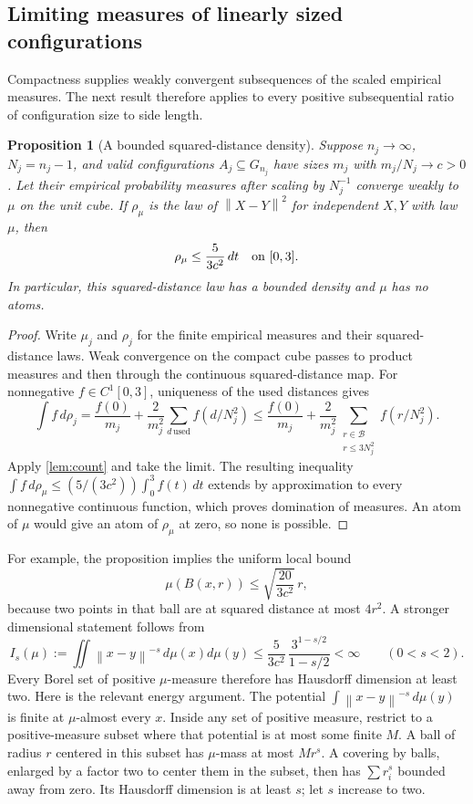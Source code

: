 \documentclass[11pt,letterpaper]{article}
\newtheorem{proposition}[theorem]{Proposition}
\theoremstyle{definition}
\newcommand{\norm}[1]{\left\lVert #1\right\rVert}
\newcommand{\calB}{\mathcal B}
\begin{document}
\subsection{Limiting measures of linearly sized configurations}
Compactness supplies weakly convergent subsequences of the scaled
empirical measures. The next result therefore applies to every
positive subsequential ratio of configuration size to side length.
\begin{proposition}[A bounded squared-distance density]
\label{prop:limiting-law}
Suppose \(n_j\to\infty\), \(N_j=n_j-1\), and valid configurations
\(A_j\subseteq G_{n_j}\) have sizes \(m_j\) with
\(m_j/N_j\to c>0\). Let their empirical probability measures after
scaling by \(N_j^{-1}\) converge weakly to \(\mu\) on the unit cube.
If \(\rho_\mu\) is the law of \(\norm{X-Y}^2\) for independent
\(X,Y\) with law \(\mu\), then
\[
 \rho_\mu\le\frac5{3c^2}\,dt\quad\hbox{on }[0,3].
\]
In particular, this squared-distance law has a bounded density and
\(\mu\) has no atoms.
\end{proposition}
\begin{proof}
Write \(\mu_j\) and \(\rho_j\) for the finite empirical measures
and their squared-distance laws. Weak convergence on the compact
cube passes to product measures and then through the continuous
squared-distance map. For nonnegative \(f\in C^1[0,3]\), uniqueness
of the used distances gives
\[
 \int f\,d\rho_j
 =\frac{f(0)}{m_j}
 +\frac2{m_j^2}\sum_{d\,\mathrm{used}}f(d/N_j^2)
 \le\frac{f(0)}{m_j}
 +\frac2{m_j^2}\sum_{\substack{r\in\calB\\r\le3N_j^2}}f(r/N_j^2).
\]
Apply \cref{lem:count} and take the limit. The resulting inequality
\(\int f\,d\rho_\mu\le(5/(3c^2))\int_0^3f(t)\,dt\)
extends by approximation to every nonnegative continuous function,
which proves domination of measures. An atom of \(\mu\) would give
an atom of \(\rho_\mu\) at zero, so none is possible.
\end{proof}

For example, the proposition implies the uniform local bound
\[
 \mu(B(x,r))\le\sqrt{\frac{20}{3c^2}}\,r,
\]
because two points in that ball are at squared distance at most
\(4r^2\). A stronger dimensional statement follows from
\[
 I_s(\mu):=\iint\norm{x-y}^{-s}\,d\mu(x)d\mu(y)
 \le\frac5{3c^2}\,
 \frac{3^{1-s/2}}{1-s/2}<\infty\qquad(0<s<2).
\]
Every Borel set of positive \(\mu\)-measure therefore has Hausdorff
dimension at least two. Here is the relevant energy argument.
The potential \(\int\norm{x-y}^{-s}\,d\mu(y)\) is finite at
\(\mu\)-almost every \(x\). Inside any set of positive measure,
restrict to a positive-measure subset where that potential is at
most some finite \(M\). A ball of radius \(r\) centered in this
subset has \(\mu\)-mass at most \(Mr^s\). A covering by balls,
enlarged by a factor two to center them in the subset, then has
\(\sum r_i^s\) bounded away from zero. Its Hausdorff dimension
is at least \(s\); let \(s\) increase to two.
\end{document}
